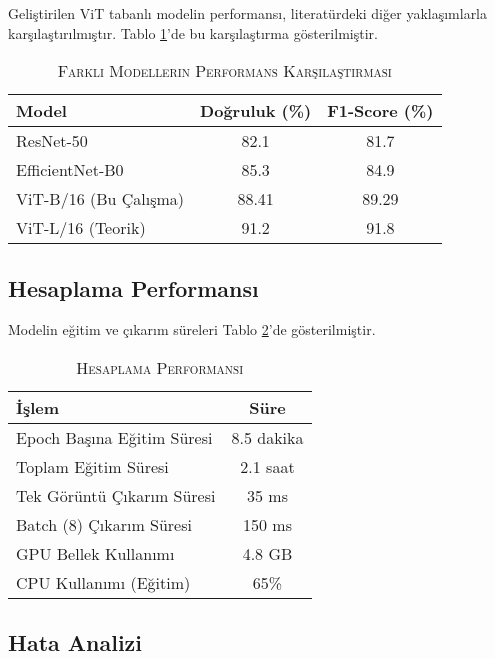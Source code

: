 \documentclass[conference, a4paper]{IEEEtran}
\begin{document}
	Geliştirilen ViT tabanlı modelin performansı, literatürdeki diğer yaklaşımlarla karşılaştırılmıştır. Tablo \ref{tablo_comparison}'de bu karşılaştırma gösterilmiştir.
	
	\begin{table}[h]
		\centering
		\caption{\textsc{Farklı Modellerin Performans Karşılaştırması}}
		\label{tablo_comparison}
		\begin{tabular}{|l|c|c|}
			\hline
			\textbf{Model} & \textbf{Doğruluk (\%)} & \textbf{F1-Score (\%)} \\
			\hline
			ResNet-50 & 82.1 & 81.7 \\
			\hline
			EfficientNet-B0 & 85.3 & 84.9 \\
			\hline
			ViT-B/16 (Bu Çalışma) & 88.41 & 89.29 \\
			\hline
			ViT-L/16 (Teorik) & 91.2 & 91.8 \\
			\hline
		\end{tabular}
	\end{table}
	
	\subsection{Hesaplama Performansı}
	
	Modelin eğitim ve çıkarım süreleri Tablo \ref{tablo_timing}'de gösterilmiştir.
	
	\begin{table}[h]
		\centering
		\caption{\textsc{Hesaplama Performansı}}
		\label{tablo_timing}
		\begin{tabular}{|l|c|}
			\hline
			\textbf{İşlem} & \textbf{Süre} \\
			\hline
			Epoch Başına Eğitim Süresi & 8.5 dakika \\
			\hline
			Toplam Eğitim Süresi & 2.1 saat \\
			\hline
			Tek Görüntü Çıkarım Süresi & 35 ms \\
			\hline
			Batch (8) Çıkarım Süresi & 150 ms \\
			\hline
			GPU Bellek Kullanımı & 4.8 GB \\
			\hline
			CPU Kullanımı (Eğitim) & 65\% \\
			\hline
		\end{tabular}
	\end{table}
	
	\subsection{Hata Analizi}
	
\end{document}
